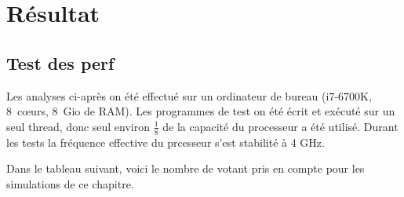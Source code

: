 \documentclass[../report]{subfiles}
\begin{document}
\part{Résultat}

\chapter{Test des perf}

Les analyses ci-après on été effectué sur un ordinateur de bureau (i7-6700K, 8~cœurs, 8~Gio de RAM).
Les programmes de test on été écrit et exécuté sur un seul thread, donc seul environ $\frac{1}{8}$ de 
la capacité du processeur a été utilisé.
Durant les tests la fréquence effective du prcesseur s'est stabilité à 4 GHz.

Dans le tableau suivant, voici le nombre de votant pris en compte pour les simulations de ce chapitre.
\end{document}
